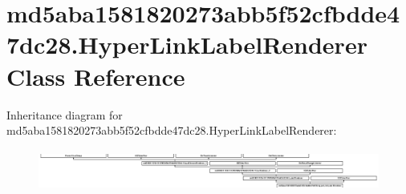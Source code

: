 \hypertarget{classmd5aba1581820273abb5f52cfbdde47dc28_1_1HyperLinkLabelRenderer}{}\section{md5aba1581820273abb5f52cfbdde47dc28.\+Hyper\+Link\+Label\+Renderer Class Reference}
\label{classmd5aba1581820273abb5f52cfbdde47dc28_1_1HyperLinkLabelRenderer}
Inheritance diagram for md5aba1581820273abb5f52cfbdde47dc28.\+Hyper\+Link\+Label\+Renderer\+:\begin{figure}[H]
\begin{center}
\leavevmode
\includegraphics[height=1.372549cm]{classmd5aba1581820273abb5f52cfbdde47dc28_1_1HyperLinkLabelRenderer}
\end{center}
\end{figure}
